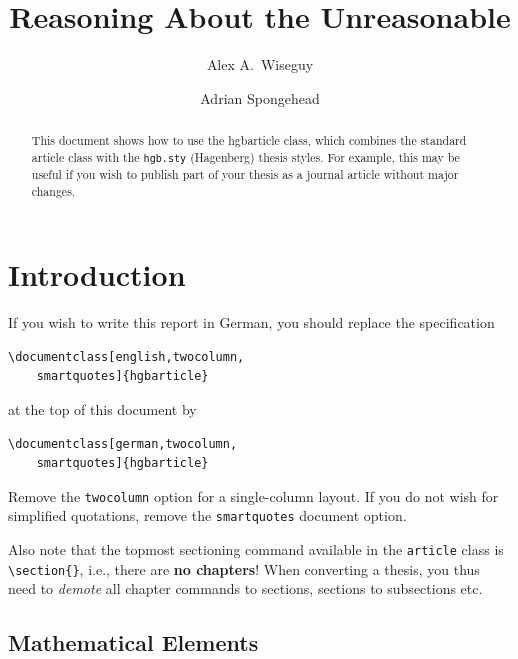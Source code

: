 \documentclass[english,twocolumn,smartquotes]{hgbarticle}
\author{
	Alex A.\ Wiseguy\\ 
	\email{wiseguy@gmail.com}
	\and
	Adrian Spongehead\\
	\email{spongehead@gmx.net}
}
\title{Reasoning About the Unreasonable}
\date{}
\begin{document}
\maketitle

\begin{abstract}\noindent
This document shows how to use the \textsf{hgbarticle} class, which combines the
standard \latex \textsf{article} class with the \texttt{hgb.sty} (Hagenberg)
thesis styles. 
For example, this may be useful if you wish to publish part of your thesis as a
journal article without major changes.
\end{abstract}


\section{Introduction}

If you wish to write this report in German, you should replace the specification
%
\begin{verbatim}
\documentclass[english,twocolumn,
    smartquotes]{hgbarticle}
\end{verbatim}
%
at the top of this document by
%
\begin{verbatim}
\documentclass[german,twocolumn,
    smartquotes]{hgbarticle}
\end{verbatim}
%
Remove the \texttt{twocolumn} option for a single-column layout. If you do not
wish for simplified quotations, remove the \texttt{smartquotes} document option.

Also note that the topmost sectioning command available in the \texttt{article}
class is \verb!\section{}!, i.e., there are \textbf{no chapters}!
When converting a thesis, you thus need to \emph{demote} all chapter commands to
sections, sections to subsections etc.

\subsection{Mathematical Elements}
\end{document}
